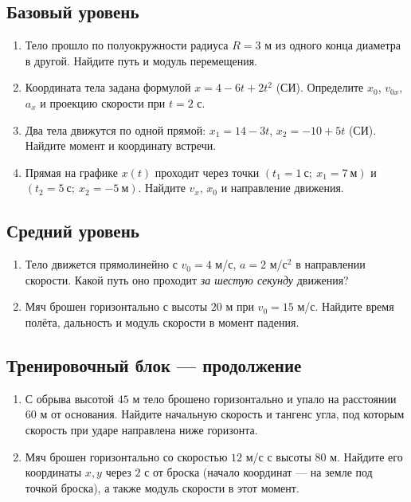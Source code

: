 \documentclass[a4paper,12pt]{article}
\begin{document}
\subsection{Базовый уровень}
\begin{enumerate}[label=\textbf{\arabic*.}]
\item Тело прошло по полуокружности радиуса $R=3$ м из одного конца диаметра в другой. Найдите путь и модуль перемещения.
\item Координата тела задана формулой $x=4-6t+2t^2$ (СИ). Определите $x_0$, $v_{0x}$, $a_x$ и проекцию скорости при $t=2$ с.
\item Два тела движутся по одной прямой: $x_1=14-3t$, $x_2=-10+5t$ (СИ). Найдите момент и координату встречи.
\item Прямая на графике $x(t)$ проходит через точки $(t_1=1\ \text{с};\ x_1=7\ \text{м})$ и $(t_2=5\ \text{с};\ x_2=-5\ \text{м})$. Найдите $v_x$, $x_0$ и направление движения.
\end{enumerate}
\subsection{Средний уровень}
\begin{enumerate}[label=\textbf{\arabic*.},start=5]
\item Тело движется прямолинейно с $v_0=4$ м/с, $a=2$ м/с$^2$ в направлении скорости. Какой путь оно проходит \textit{за шестую секунду} движения?
\item Мяч брошен горизонтально с высоты $20$ м при $v_0=15$ м/с. Найдите время полёта, дальность и модуль скорости в момент падения.
\end{enumerate}
\clearpage
\subsection*{Тренировочный блок --- продолжение}
\begin{enumerate}[label=\textbf{\arabic*.},start=7]
\item С обрыва высотой $45$ м тело брошено горизонтально и упало на расстоянии $60$ м от основания. Найдите начальную скорость и тангенс угла, под которым скорость при ударе направлена ниже горизонта.
\item Мяч брошен горизонтально со скоростью $12$ м/с с высоты $80$ м. Найдите его координаты $x,y$ через $2$ с от броска (начало координат --- на земле под точкой броска), а также модуль скорости в этот момент.
\end{enumerate}
\end{document}
